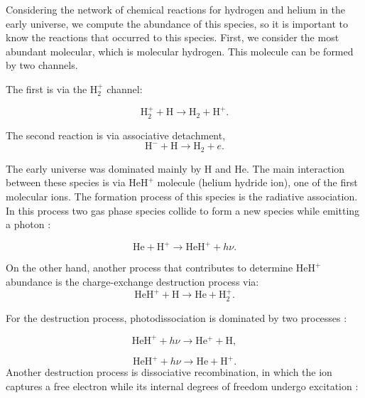 \documentclass[baaa]{baaa}
\begin{document}
Considering the network of chemical reactions for hydrogen and helium in the early universe, we compute the abundance of this species, so it is important to know the reactions that occurred to this species. First, we consider the most abundant molecular, which is molecular hydrogen. This molecule can be formed by two channels. 

The first is via the $\mathrm{H_2^+}$ channel:

\begin{equation}
    \mathrm{H_2^+} + \mathrm{H} \longrightarrow \mathrm{H_2} + \mathrm{H}^+.
\end{equation}

The second reaction is via associative detachment, 
\begin{equation}
\mathrm{H^-} + \mathrm{H} \longrightarrow \mathrm{H_2} + e.
\end{equation}

The early universe was dominated mainly by $\mathrm{H}$ and $\mathrm{He}$. The main interaction between these species is via $\mathrm{HeH^+}$ molecule (helium hydride ion), one of the first molecular ions. The formation process of this species is the radiative association. In this process two gas phase species collide to form a new species while emitting a photon \citet{Bates}: %

\begin{equation} \label{Radiative association}
    \mathrm{He} + \mathrm{H^+} \longrightarrow \mathrm{HeH^+} + h\nu.
\end{equation}

On the other hand, another process that contributes to determine $\mathrm{HeH^+}$ abundance is the charge-exchange destruction process via:
\begin{equation} \label{charge-exchange}
    \mathrm{HeH^+} + \mathrm{H} \longrightarrow \mathrm{He} + \mathrm{H_2^+}.
\end{equation}

For the destruction process, photodissociation is dominated by two processes \citet{Coppola2017}:

\begin{equation}\label{photodissociation 1}
    \mathrm{HeH^+} + h\nu \longrightarrow \mathrm{He^+} + \mathrm{H},
\end{equation}

\begin{equation}\label{photodissociation 2}
    \mathrm{HeH^+} + h\nu \longrightarrow \mathrm{He} + \mathrm{H^+}.
\end{equation}
Another destruction process is dissociative recombination, in which the ion captures a free electron while its internal degrees of freedom undergo excitation \citet{Novotny2019}:
\end{document}
